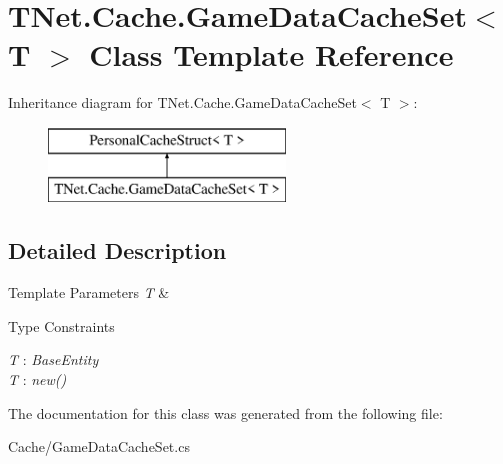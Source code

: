 \hypertarget{class_t_net_1_1_cache_1_1_game_data_cache_set}{}\section{T\+Net.\+Cache.\+Game\+Data\+Cache\+Set$<$ T $>$ Class Template Reference}
\label{class_t_net_1_1_cache_1_1_game_data_cache_set}


 


Inheritance diagram for T\+Net.\+Cache.\+Game\+Data\+Cache\+Set$<$ T $>$\+:\begin{figure}[H]
\begin{center}
\leavevmode
\includegraphics[height=2.000000cm]{class_t_net_1_1_cache_1_1_game_data_cache_set}
\end{center}
\end{figure}


\subsection{Detailed Description}



\begin{DoxyTemplParams}{Template Parameters}
{\em T} & \\
\hline
\end{DoxyTemplParams}
\begin{Desc}
\item[Type Constraints]\begin{description}
\item[{\em T} : {\em Base\+Entity}]\item[{\em T} : {\em new()}]\end{description}
\end{Desc}


The documentation for this class was generated from the following file\+:\begin{DoxyCompactItemize}
\item 
Cache/Game\+Data\+Cache\+Set.\+cs\end{DoxyCompactItemize}
